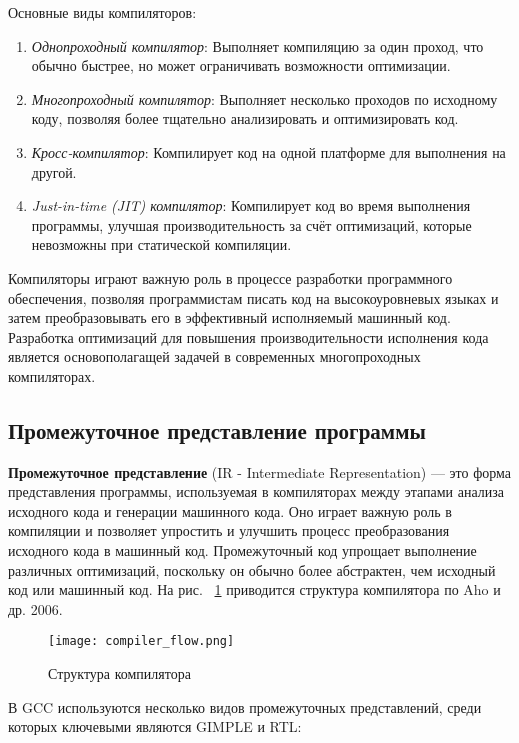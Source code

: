 Основные виды компиляторов:
\begin{enumerate}
    \item \textit{Однопроходный компилятор}: Выполняет компиляцию за один проход, что обычно быстрее, но может ограничивать возможности оптимизации.
    \item \textit{Многопроходный компилятор}: Выполняет несколько проходов по исходному коду, позволяя более тщательно анализировать и оптимизировать код.
    \item \textit{Кросс-компилятор}: Компилирует код на одной платформе для выполнения на другой.
    \item \textit{Just-in-time (JIT) компилятор}: Компилирует код во время выполнения программы, улучшая производительность за счёт оптимизаций, которые невозможны при статической компиляции.
\end{enumerate}

Компиляторы играют важную роль в процессе разработки программного обеспечения, позволяя программистам писать код на высокоуровневых языках и затем преобразовывать его в эффективный исполняемый машинный код. Разработка оптимизаций для повышения производительности исполнения кода является основополагащей задачей в современных многопроходных компиляторах.

\subsection{Промежуточное представление программы}

\textbf{Промежуточное представление} (IR - Intermediate Representation) — это форма представления программы, используемая в компиляторах между этапами анализа исходного кода и генерации машинного кода. Оно играет важную роль в компиляции и позволяет упростить и улучшить процесс преобразования исходного кода в машинный код. Промежуточный код упрощает выполнение различных оптимизаций, поскольку он обычно более абстрактен, чем исходный код или машинный код.  На рис. ~\ref{flow} приводится структура
компилятора по Aho и др. 2006. \cite{aho2006compilers}

\begin{figure}[!htb]
    \centering
    \texttt{[image: compiler\_flow.png]}\\
    \caption{Структура компилятора}
    \label{flow}
\end{figure}

В GCC используются несколько видов промежуточных представлений, среди которых ключевыми являются GIMPLE и RTL:

